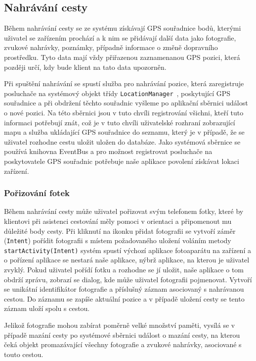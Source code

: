 \documentclass[czech,master,public,dept460,male,java,cpdeclaration]{diploma}
\begin{document}
\subsection{Nahrávání cesty}
Během nahrávání cesty se ze systému získávají GPS souřadnice bodů, kterými uživatel se zařízením prochází
a k nim se přidávají další data jako fotografie, zvukové nahrávky, poznámky,
případně informace o změně dopravního prostředku. Tyto data mají vždy přiřazenou zaznamenanou
GPS pozici, která později určí, kdy bude klient na tato data upozorněn.

Při spuštění nahrávání se spustí služba pro nahrávání pozice, která zaregistruje
posluchače na systémový objekt třídy \texttt{LocationManager}~\cite{androiddevelopers},
poskytující GPS souřadnice a při obdržení těchto souřadnic
vyšleme po aplikační sběrnici událost o nové pozici. Na této sběrnici jsou v tuto chvíli
registrování všichni, kteří tuto informaci potřebují znát, což je v tuto chvíli uživatelské rozhraní
zobrazující mapu a služba ukládající GPS souřadnice do seznamu, který je v případě, že se uživatel
rozhodne cestu uložit uložen do databáze. Jako systémová sběrnice se používá knihovna EventBus a pro
možnost registrovat posluchače na poskytovatele GPS souřadnic potřebuje naše aplikace povolení
získávat lokaci zařízení.

\subsubsection{Pořizování fotek}
Během nahrávání cesty může uživatel pořizovat svým telefonem fotky, které by klientovi při asistenci
cestování měly pomoci v orientaci a připomenout mu důležité body cesty. Při kliknutí na ikonku přidat
fotografii se vytvoří záměr (\texttt{Intent}) pořídit fotografii s místem požadovaného uložení voláním metody
\texttt{startActivity(Intent)} systém spustí
výchozí aplikace fotoaparátu na zařízení a o pořízení aplikace se nestará naše
aplikace, nýbrž aplikace, na kterou je uživatel zvyklý. Pokud uživatel pořídí fotku a rozhodne se jí
uložit, naše aplikace o tom obdrží zprávu, zobrazí se dialog, kde může uživatel fotografii pojmenovat.
Vytvoří se unikátní identifikátor fotografie a příslušný záznam asociovaný s nahrávanou cestou.
Do záznamu se zapíše aktuální pozice a v případě uložení cesty se tento záznam uloží spolu s cestou.

Jelikož fotografie mohou zabírat poměrně velké množství paměti, vysílá se v případě mazání cesty po
systémové sběrnici událost o mazání cesty, na kterou čeká objekt promazávající všechny fotografie
a zvukové nahrávky, asociované s touto cestou.
\end{document}
